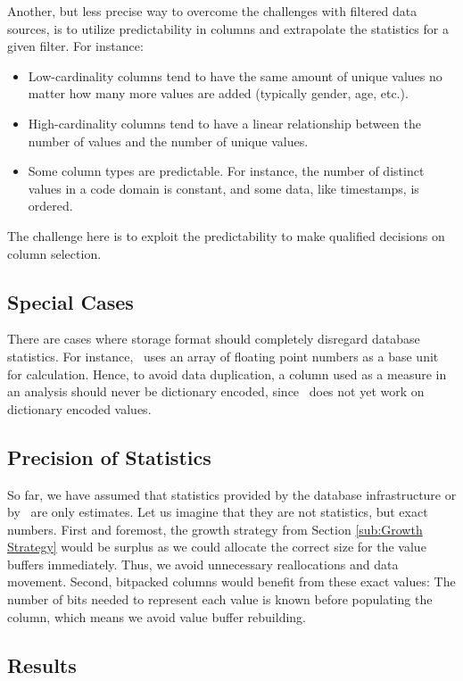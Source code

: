 Another, but less precise way to overcome the challenges with filtered data sources, is to utilize predictability in columns and extrapolate the statistics for a given filter. For instance:
\begin{itemize}
    \item Low-cardinality columns tend to have the same amount of unique values no matter how many more values are added (typically gender, age, etc.).
    \item High-cardinality columns tend to have a linear relationship between the number of values and the number of unique values.
    \item Some column types are predictable. For instance, the number of distinct values in a code domain is constant, and some data, like timestamps, is ordered.
\end{itemize}
The challenge here is to exploit the predictability to make qualified decisions on column selection.

\subsection{Special Cases}
\label{sub:Special Cases}

There are cases where storage format should completely disregard database statistics. For instance, \gd~uses an array of floating point numbers as a base unit for calculation. Hence, to avoid data duplication, a column used as a measure in an analysis should never be dictionary encoded, since \gd~does not yet work on dictionary encoded values.

\subsection{Precision of Statistics}

So far, we have assumed that statistics provided by the database infrastructure or by \gap~are only estimates. Let us imagine that they are not statistics, but exact numbers. First and foremost, the growth strategy from Section \ref{sub:Growth Strategy} would be surplus as we could allocate the correct size for the value buffers immediately. Thus, we avoid unnecessary reallocations and data movement. Second, bitpacked columns would benefit from these exact values: The number of bits needed to represent each value is known before populating the column, which means we avoid value buffer rebuilding.


\subsection{Results}
\label{sub:Results}

